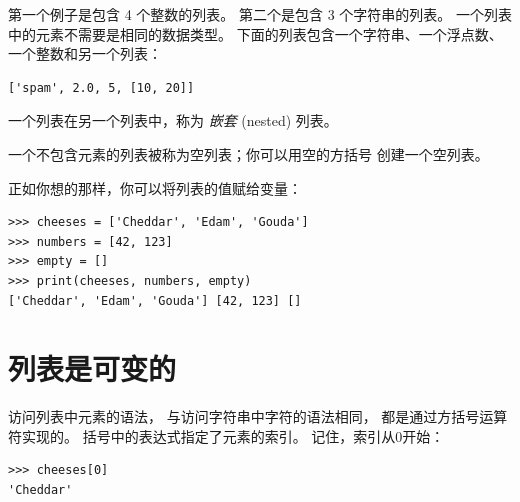 第一个例子是包含 4 个整数的列表。
第二个是包含 3 个字符串的列表。
一个列表中的元素不需要是相同的数据类型。
下面的列表包含一个字符串、一个浮点数、一个整数和另一个列表：

\begin{lstlisting}
['spam', 2.0, 5, [10, 20]]
\end{lstlisting}

%

一个列表在另一个列表中，称为 {\em 嵌套} (nested) 列表。
  


一个不包含元素的列表被称为空列表；你可以用空的方括号 \li{[]} 创建一个空列表。

  


正如你想的那样，你可以将列表的值赋给变量：

\begin{lstlisting}
>>> cheeses = ['Cheddar', 'Edam', 'Gouda']
>>> numbers = [42, 123]
>>> empty = []
>>> print(cheeses, numbers, empty)
['Cheddar', 'Edam', 'Gouda'] [42, 123] []
\end{lstlisting}
%

\section{列表是可变的}
\label{mutable}
  
  


访问列表中元素的语法， 与访问字符串中字符的语法相同， 都是通过方括号运算符实现的。
括号中的表达式指定了元素的索引。
记住，索引从0开始：

\begin{lstlisting}
>>> cheeses[0]
'Cheddar'
\end{lstlisting}

